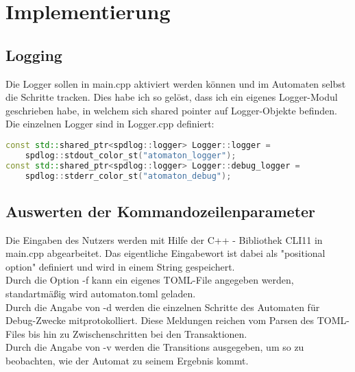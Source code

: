 \documentclass[12pt,a4paper]{article}
\begin{document}
\section{Implementierung}

\subsection{Logging}
Die Logger sollen in main.cpp aktiviert werden können und im Automaten selbst die Schritte tracken. Dies habe ich so gelöst, dass ich ein eigenes Logger-Modul geschrieben habe, in welchem sich shared pointer auf Logger-Objekte befinden.
\\
Die einzelnen Logger sind in Logger.cpp definiert:
\begin{lstlisting}[language=C++]
const std::shared_ptr<spdlog::logger> Logger::logger = 
	spdlog::stdout_color_st("atomaton_logger");
const std::shared_ptr<spdlog::logger> Logger::debug_logger = 
	spdlog::stderr_color_st("atomaton_debug");
\end{lstlisting}

\subsection{Auswerten der Kommandozeilenparameter}
Die Eingaben des Nutzers werden mit Hilfe der C++ - Bibliothek CLI11 in main.cpp abgearbeitet. Das eigentliche Eingabewort ist dabei als "positional option" definiert und wird in einem String gespeichert. 
\\
\medskip
Durch die Option -f kann ein eigenes TOML-File angegeben werden, standartmäßig wird automaton.toml geladen.
\\
\medskip
Durch die Angabe von -d werden die einzelnen Schritte des Automaten für Debug-Zwecke mitprotokolliert. Diese Meldungen reichen vom Parsen des TOML-Files bis hin zu Zwischenschritten bei den Transaktionen.
\\
\medskip
Durch die Angabe von -v werden die Transitions ausgegeben, um so zu beobachten, wie der Automat zu seinem Ergebnis kommt.
\end{document}

